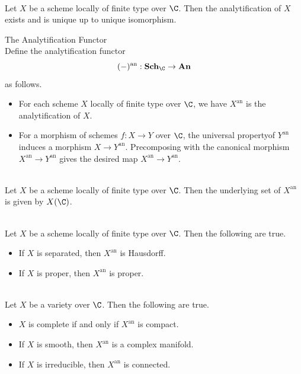 \documentclass[a4paper]{article}
\begin{document}
\begin{thm}{}{}\\
Let $X$ be a scheme locally of finite type over $\C$. Then the analytification of $X$ exists and is unique up to unique isomorphism. 
\end{thm}

\begin{defn}{The Analytification Functor}{}\\
Define the analytification functor $$(-)^\text{an}:\bold{Sch}_\C\to\bold{An}$$ as follows. 
\begin{itemize}
\item For each scheme $X$ locally of finite type over $\C$, we have $X^\text{an}$ is the analytification of $X$. 
\item For a morphism of schemes $f:X\to Y$ over $\C$, the universal propertyof $Y^\text{an}$ induces a morphism $X\to Y^\text{an}$. Precomposing with the canonical morphism $X^\text{an}\to Y^\text{an}$ gives the desired map $X^\text{an}\to Y^\text{an}$. 
\end{itemize}
\end{defn}

\begin{prp}{}{}\\
Let $X$ be a scheme locally of finite type over $\C$. Then the underlying set of $X^\text{an}$ is given by $X(\C)$. 
\end{prp}

\begin{prp}{}{}\\
Let $X$ be a scheme locally of finite type over $\C$. Then the following are true. 
\begin{itemize}
\item If $X$ is separated, then $X^\text{an}$ is Hausdorff. 
\item If $X$ is proper, then $X^\text{an}$ is proper. 
\end{itemize}
\end{prp}

\begin{prp}{}{}\\
Let $X$ be a variety over $\C$. Then the following are true. 
\begin{itemize}
\item $X$ is complete if and only if $X^\text{an}$ is compact. 
\item If $X$ is smooth, then $X^\text{an}$ is a complex manifold. 
\item If $X$ is irreducible, then $X^\text{an}$ is connected. 
\end{itemize}
\end{prp}
\end{document}
